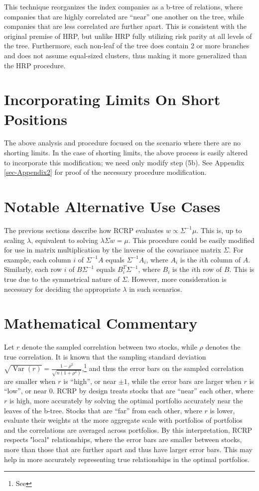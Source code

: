 \documentclass[10pt,twoside,titlepage]{article}   %
\begin{document}
This technique reorganizes the index companies as a b-tree of relations, where companies that are highly correlated are “near” one another on the tree, 
while companies that are less correlated are further apart. 
This is consistent with the original premise of HRP, but unlike HRP fully utilizing risk parity at all levels of the tree. 
Furthermore, each non-leaf of the tree does contain 2 or more branches and does not assume equal-sized clusters, thus making it more generalized than the HRP procedure.


\section{Incorporating Limits On Short Positions}\label{sec-LimitShorts}
The above analysis and procedure focused on the scenario where there are no shorting limits. 
In the case of shorting limits, the above process is easily altered to incorporate this modification; we need only modify step (5b).
See Appendix \ref{sec-Appendix2} for proof of the necessary procedure modification.


\section{Notable Alternative Use Cases}\label{sec-AltUseCase}
The previous sections describe how RCRP evaluates $w \propto \Sigma^{-1}\mu$. This is, up to scaling $\lambda$, equivalent to solving $\lambda \Sigma w = \mu$. 
This procedure could be easily modified for use in matrix multiplication by the inverse of the covariance matrix $\Sigma$. 
For example, each column $i$ of $\Sigma^{-1}A$ equals $\Sigma^{-1}A_i$, where $A_i$ is the $i$th column of $A$. 
Similarly, each row $i$ of $B\Sigma^{-1}$ equals $B_i^T\Sigma^{-1}$, where $B_i$ is the $i$th row of $B$.
This is true due to the symmetrical nature of $\Sigma$. 
However, more consideration is necessary for deciding the appropriate $\lambda$ in such scenarios.

\section{Mathematical Commentary}\label{sec-MatheComment}
Let $r$ denote the sampled correlation between two stocks, while $\rho$ denotes the true correlation. 
It is known that the sampling standard deviation $\sqrt{\operatorname{Var}(r)}= \frac{ 1 - \rho^2}{\sqrt{n (1+\rho^2) }}$,\footnote{See \CORRURL} 
and thus the error bars on the sampled correlation are smaller when $r$ is “high”, or near $\pm 1$, 
while the error bars are larger when $r$ is “low”, or near 0. 
RCRP by design treats stocks that are “near” each other, where $r$ is high, 
more accurately by solving the optimal portfolio accurately near the leaves of the b-tree. 
Stocks that are “far” from each other, where $r$ is lower,  
evaluate their weights at the more aggregate scale with portfolios of portfolios and the correlations are averaged across portfolios. 
By this interpretation, RCRP respects \''local" relationships, where the error bars are smaller between stocks, more than those that are further apart and thus have larger error bars. 
This may help in more accurately representing true relationships in the optimal portfolios.
\end{document}
